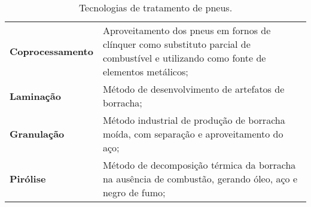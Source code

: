 \begin{table}[htbp]
  \centering
  \caption{Tecnologias de tratamento de pneus.}
    \begin{tabular}{p{8.785em}|p{29.57em}|}
\cmidrule{2-2}    \rowcolor[rgb]{ .984,  .831,  .706} \textbf{Coprocessamento} & Aproveitamento dos pneus em fornos de clínquer como substituto parcial de combustível e utilizando como fonte de elementos metálicos; \\
    \rowcolor[rgb]{ .992,  .914,  .851} \textbf{Laminação} & Método de desenvolvimento de artefatos de borracha; \\
    \rowcolor[rgb]{ .984,  .831,  .706} \textbf{Granulação} & Método industrial de produção de borracha moída, com separação e aproveitamento do aço; \\
    \rowcolor[rgb]{ .992,  .914,  .851} \textbf{Pirólise} & Método de decomposição térmica da borracha na ausência de combustão, gerando óleo, aço e negro de fumo; \\
\cmidrule{2-2}    
\end{tabular}%
  \label{tab:tratamento_pneus}%
\end{table}%
